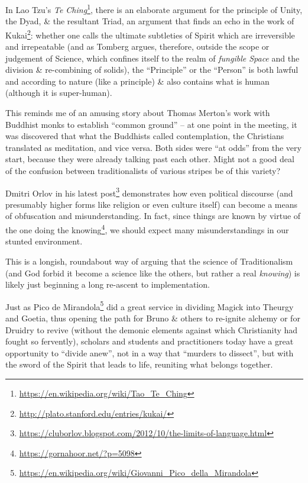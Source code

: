 In Lao Tzu's \emph{Te Ching}\footnote{\url{https://en.wikipedia.org/wiki/Tao\_Te\_Ching}}, there is an elaborate argument for the principle of Unity, the Dyad, \& the resultant Triad, an argument that finds an echo in the work of Kukai\footnote{\url{http://plato.stanford.edu/entries/kukai/}}: whether one calls the ultimate subtleties of Spirit which are irreversible and irrepeatable (and as Tomberg argues, therefore, outside the scope or judgement of Science, which confines itself to the realm of
\emph{fungible Space} and the division \& re-combining of solids), the ``Principle'' or the ``Person'' is both lawful and according to nature (like a principle) \& also contains what is human (although it is super-human).

This reminds me of an amusing story about Thomas Merton's work with Buddhist monks to establish ``common ground'' -- at one point in the meeting, it was discovered that what the Buddhists called contemplation, the Christians translated as meditation, and vice versa. Both sides were ``at odds'' from the very start, because they were already talking past each other. Might not a good deal of the confusion between traditionalists of various stripes be of this variety?

Dmitri Orlov in his latest post\footnote{\url{https://cluborlov.blogspot.com/2012/10/the-limits-of-language.html}} demonstrates how even political discourse (and presumably higher forms like religion or even culture itself) can become a means of obfuscation and misunderstanding. In fact, since things are known by virtue of the one doing the knowing\footnote{\url{https://gornahoor.net/?p=5098}}, we should expect many misunderstandings in our stunted environment.

This is a longish, roundabout way of arguing that the science of Traditionalism (and God forbid it become a science like the others, but rather a real \emph{knowing}) is likely just beginning a long re-ascent to implementation.

Just as Pico de Mirandola\footnote{\url{https://en.wikipedia.org/wiki/Giovanni\_Pico\_della\_Mirandola}} did a great service in dividing Magick into Theurgy and Goetia, thus opening the path for Bruno \& others to re-ignite alchemy or for Druidry to revive (without the demonic elements against which Christianity had fought so fervently), scholars and students and practitioners today have a great opportunity to ``divide anew'', not in a way that ``murders to dissect'', but with the sword of the Spirit that leads to life, reuniting what belongs together.



